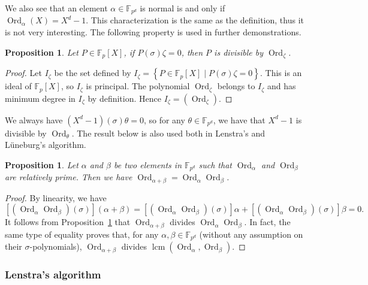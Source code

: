 \documentclass[a4paper,11pt]{article}
\theoremstyle{break}
\newtheorem{prop}[thm]{Proposition}
\theoremstyle{sc}
\theoremstyle{definition}
\theoremstyle{remark}
\DeclareMathOperator{\Ord}{Ord}
\DeclareMathOperator{\lcm}{lcm}
\begin{document}
  
We also see that an element
$\alpha\in\mathbb{F}_{p^d}$ is normal is and only if
$\Ord_\alpha(X)=X^d-1$. This characterization is the same as the
definition, thus it is not very interesting. The following property is used in
further demonstrations.

\begin{prop}
  \label{orderDiv}
  Let $P\in\mathbb{F}_p[X]$, if $P(\sigma)\zeta=0$, then $P$ is divisible
  by $\Ord_{\zeta}$.
\end{prop}
\begin{proof}
  Let $I_\zeta$ be the set defined by $I_\zeta=\left\{P\in\mathbb{F}_p[X]\;|\; P(\sigma)\zeta
  = 0
\right\}$. This is an ideal of $\mathbb{F}_p[X]$, so $I_\zeta$ is principal. The
polynomial 
$\Ord_\zeta$ belongs to $I_\zeta$ and has minimum degree in $I_\zeta$ by definition.
Hence $I_\zeta=(\Ord_\zeta)$.
\end{proof}
We always have $(X^d-1)(\sigma)\theta=0$, so for any
$\theta\in\mathbb{F}_{p^d}$, we have that $X^d-1$ is divisible by
$\Ord_\theta$. The result below is also used both in Lenstra's and Lüneburg's
algorithm.
\begin{prop}
  \label{orderMul}
  Let $\alpha$ and $\beta$ be two elements in $\mathbb{F}_{p^d}$ such that
  $\Ord_\alpha$ and $\Ord_\beta$ are relatively prime. Then we have
  $\Ord_{\alpha+\beta}=\Ord_\alpha\Ord_\beta$.
\end{prop}
\begin{proof}
  By linearity, we have
  \[
  [(\Ord_\alpha\Ord_\beta)(\sigma)](\alpha+\beta)=[(\Ord_\alpha\Ord_\beta)(\sigma)]\alpha+[(\Ord_\alpha\Ord_\beta)(\sigma)]\beta=0.
\]
It follows from Proposition~\ref{orderDiv} that $\Ord_{\alpha+\beta}$ divides
$\Ord_\alpha\Ord_\beta$. In fact, the same type of equality proves that, for
any $\alpha,\beta\in\mathbb{F}_{p^d}$ (without any assumption on their
$\sigma$-polynomials), $\Ord_{\alpha+\beta}$ divides
$\lcm(\Ord_\alpha, \Ord_\beta)$.
\end{proof}

\subsubsection{Lenstra's algorithm}
\end{document}
